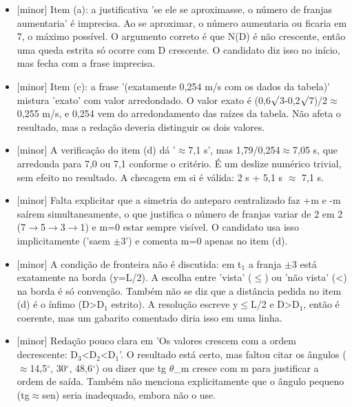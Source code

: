 \documentclass{article}%
\begin{document}
\begin{itemize}%
\item%
{[}minor{]} Item (a): a justificativa 'se ele se aproximasse, o número de franjas aumentaria' é imprecisa. Ao se aproximar, o número aumentaria ou ficaria em 7, o máximo possível. O argumento correto é que N(D) é não crescente, então uma queda estrita só ocorre com D crescente. O candidato diz isso no início, mas fecha com a frase imprecisa.%
\item%
{[}minor{]} Item (c): a frase '(exatamente 0,254 m/s com os dados da tabela)' mistura 'exato' com valor arredondado. O valor exato é (0,6$\surd$3-0,2$\surd$7)/2$\approx$0,255 m/s, e 0,254 vem do arredondamento das raízes da tabela. Não afeta o resultado, mas a redação deveria distinguir os dois valores.%
\item%
{[}minor{]} A verificação do item (d) dá '$\approx$7,1 s', mas 1,79/0,254$\approx$7,05 s, que arredonda para 7,0 ou 7,1 conforme o critério. É um deslize numérico trivial, sem efeito no resultado. A checagem em si é válida: 2 s + 5,1 s $\approx$ 7,1 s.%
\item%
{[}minor{]} Falta explicitar que a simetria do anteparo centralizado faz +m e -m saírem simultaneamente, o que justifica o número de franjas variar de 2 em 2 (7$\to$5$\to$3$\to$1) e m=0 estar sempre visível. O candidato usa isso implicitamente ('saem $\pm$3') e comenta m=0 apenas no item (d).%
\item%
{[}minor{]} A condição de fronteira não é discutida: em t$_{1}$ a franja $\pm$3 está exatamente na borda (y=L/2). A escolha entre 'vista' ($\leq$) ou 'não vista' (<) na borda é só convenção. Também não se diz que a distância pedida no item (d) é o ínfimo (D>D$_{1}$ estrito). A resolução escreve y$\leq$L/2 e D>D$_{1}$, então é coerente, mas um gabarito comentado diria isso em uma linha.%
\item%
{[}minor{]} Redação pouco clara em 'Os valores crescem com a ordem decrescente: D$_{3}$<D$_{2}$<D$_{1}$'. O resultado está certo, mas faltou citar os ângulos ($\approx$14,5$^\circ$, 30$^\circ$, 48,6$^\circ$) ou dizer que tg $\theta$\_m cresce com m para justificar a ordem de saída. Também não menciona explicitamente que o ângulo pequeno (tg$\approx$sen) seria inadequado, embora não o use.%
\end{itemize}%
\end{document}

